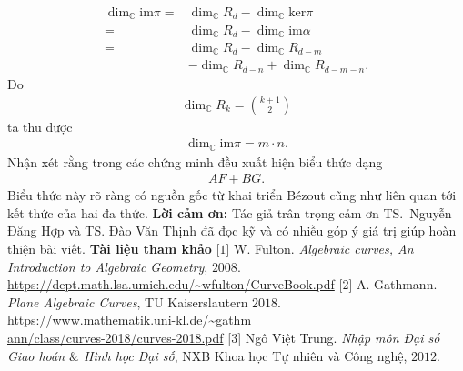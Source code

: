 \begin{multicols}{2}
	\begin{align*} \dim_{\mathbb C}\textrm{im}\pi=&\dim_{\mathbb C}R_d-\dim_{\mathbb C}\textrm{ker}\pi\\
		=& \dim_{\mathbb C}R_d-\dim_{\mathbb C}\textrm{im}\alpha\\
		=& \dim_{\mathbb C}R_d-\dim_{\mathbb C}R_{d-m}\\
		&-\dim_{\mathbb C}R_{d-n}+ 
		\dim_{\mathbb C}R_{d-m-n}.
	\end{align*}
	Do
	\begin{align*}
		\dim_{\mathbb C}R_k={k+1\choose 2}
	\end{align*}
	ta thu được 
	\begin{align*}
		\dim_{\mathbb C}\textrm{im}\pi=  m\cdot n.
	\end{align*}
	Nhận xét rằng trong các chứng minh đều xuất hiện biểu thức dạng
	\begin{align*}
		AF+BG.
	\end{align*}
	Biểu thức này rõ ràng có nguồn gốc từ khai triển Bézout cũng như liên quan tới kết thức của hai đa thức. 
	\vskip 0.1cm
	\textbf{\color{duongvaotoanhoc}Lời cảm ơn:} Tác giả trân trọng cảm ơn TS.~Nguyễn Đăng Hợp và TS. Đào Văn Thịnh đã đọc kỹ và có nhiều góp ý giá trị giúp hoàn thiện bài viết.  
	\vskip 0.1cm
	\textbf{\color{duongvaotoanhoc}Tài liệu tham khảo}
	\vskip 0.1cm
	[$1$]  W. Fulton. {\em Algebraic curves, An Introduction to Algebraic Geometry}, $2008$.\\
	\url{https://dept.math.lsa.umich.edu/~wfulton/CurveBook.pdf}
	\vskip 0.1cm
	[$2$]  A. Gathmann. {\em Plane Algebraic Curves}, TU Kaiserslautern $2018$.\\ 
	\url{https://www.mathematik.uni-kl.de/~gathm}\\ \url{ann/class/curves-2018/curves-2018.pdf}
	\vskip 0.1cm	
	[$3$] Ngô Việt Trung. {\em Nhập môn Đại số Giao hoán $\&$ Hình học Đại số}, NXB Khoa học Tự nhiên và Công nghệ, $2012$.
\end{multicols}